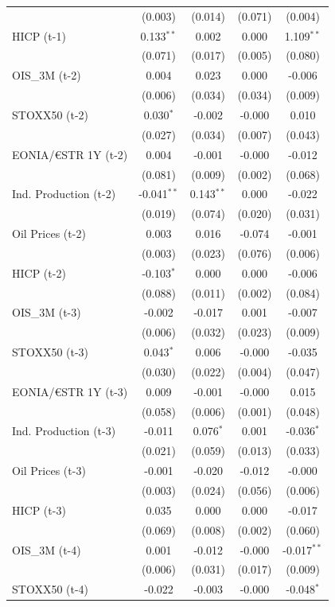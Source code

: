 \begin{longtable}[t]{lcccc}
 & (0.003) & (0.014) & (0.071) & (0.004)\\
HICP (t-1) & 0.133$^{**}$ & 0.002 & 0.000 & 1.109$^{**}$\\
 & (0.071) & (0.017) & (0.005) & (0.080)\\
OIS\_3M (t-2) & 0.004 & 0.023 & 0.000 & -0.006\\
 & (0.006) & (0.034) & (0.034) & (0.009)\\
STOXX50 (t-2) & 0.030$^{*}$ & -0.002 & -0.000 & 0.010\\
 & (0.027) & (0.034) & (0.007) & (0.043)\\
EONIA/€STR 1Y (t-2) & 0.004 & -0.001 & -0.000 & -0.012\\
 & (0.081) & (0.009) & (0.002) & (0.068)\\
Ind. Production (t-2) & -0.041$^{**}$ & 0.143$^{**}$ & 0.000 & -0.022\\
 & (0.019) & (0.074) & (0.020) & (0.031)\\
Oil Prices (t-2) & 0.003 & 0.016 & -0.074 & -0.001\\
 & (0.003) & (0.023) & (0.076) & (0.006)\\
HICP (t-2) & -0.103$^{*}$ & 0.000 & 0.000 & -0.006\\
 & (0.088) & (0.011) & (0.002) & (0.084)\\
OIS\_3M (t-3) & -0.002 & -0.017 & 0.001 & -0.007\\
 & (0.006) & (0.032) & (0.023) & (0.009)\\
STOXX50 (t-3) & 0.043$^{*}$ & 0.006 & -0.000 & -0.035\\
 & (0.030) & (0.022) & (0.004) & (0.047)\\
EONIA/€STR 1Y (t-3) & 0.009 & -0.001 & -0.000 & 0.015\\
 & (0.058) & (0.006) & (0.001) & (0.048)\\
Ind. Production (t-3) & -0.011 & 0.076$^{*}$ & 0.001 & -0.036$^{*}$\\
 & (0.021) & (0.059) & (0.013) & (0.033)\\
Oil Prices (t-3) & -0.001 & -0.020 & -0.012 & -0.000\\
 & (0.003) & (0.024) & (0.056) & (0.006)\\
HICP (t-3) & 0.035 & 0.000 & 0.000 & -0.017\\
 & (0.069) & (0.008) & (0.002) & (0.060)\\
OIS\_3M (t-4) & 0.001 & -0.012 & -0.000 & -0.017$^{**}$\\
 & (0.006) & (0.031) & (0.017) & (0.009)\\
STOXX50 (t-4) & -0.022 & -0.003 & -0.000 & -0.048$^{*}$\\

\end{longtable}
